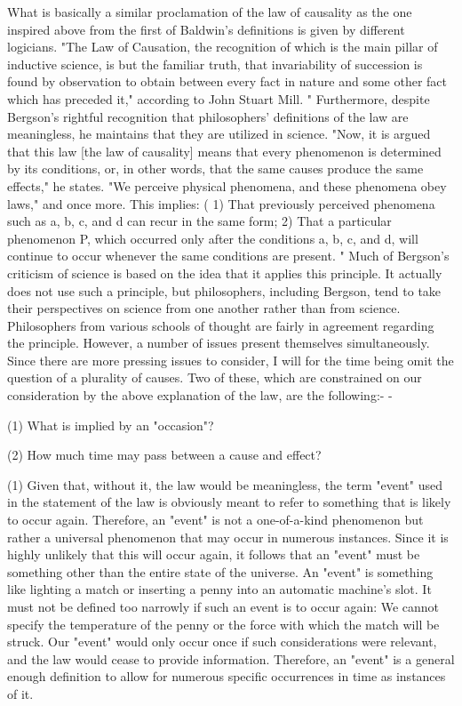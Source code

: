 \documentclass[a4paper,12pt]{book}[2004/02/16]
\theoremstyle{ilemma}
\theoremstyle{itheorem}
\theoremstyle{iother}
\theoremstyle{icorollary}
\theoremstyle{numcorollary}
\theoremstyle{idefinition}
\begin{document}
What is basically a similar proclamation of the law of causality as the
one inspired above from the first of Baldwin's definitions is given by
different logicians. "The Law of Causation, the recognition of which is the main pillar of inductive science, is but the familiar truth, that invariability of succession is found by observation to obtain between every fact in nature and some other fact which has preceded it," according to John Stuart Mill. " Furthermore, despite Bergson's rightful recognition that philosophers' definitions of the law are meaningless, he maintains that they are utilized in science. "Now, it is argued that this law [the law of causality] means that every phenomenon is determined by its conditions, or, in other words, that the same causes produce the same effects," he states. "We perceive physical phenomena, and these phenomena obey laws," and once more. This
implies: ( 1) That previously perceived phenomena such as a, b, c, and d can recur in the same form; 2) That a particular phenomenon P, which occurred only after the conditions a, b, c, and d, will continue to occur whenever the same conditions are present. " Much of Bergson's criticism of science is based on the idea that it applies this principle. It actually does not use such a principle, but philosophers, including Bergson, tend to take their perspectives on science from one another rather than from science. Philosophers from various schools of thought are fairly in agreement regarding the principle.
However, a number of issues present themselves simultaneously. Since there are more pressing issues to consider, I will for the time being omit the question of a plurality of causes. Two of these, which are constrained
on our consideration by the above explanation of the law, are the
following:- -

  (1) What is implied by an "occasion"?

  (2) How much time may pass between a cause and effect?

(1) Given that, without it, the law would be meaningless, the term "event" used in the statement of the law is obviously meant to refer to something that is likely to occur again. Therefore, an "event" is not a one-of-a-kind phenomenon but rather a universal phenomenon that may occur in numerous instances. Since it is highly unlikely that this will occur again, it follows that an "event" must be something other than the entire state of the universe. An "event" is something like lighting a match or inserting a penny into an automatic machine's slot. It must not be defined too narrowly if such an event is to occur again: We cannot specify the temperature of the penny or the force with which the match will be struck. Our "event" would only occur once if such considerations were relevant, and the law would cease to provide information. Therefore, an "event" is a general enough definition to allow for numerous specific occurrences in time as instances of it.
\end{document}
